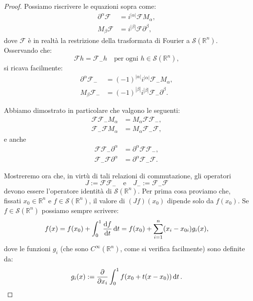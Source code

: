 \begin{proof}
Possiamo riscrivere le equazioni sopra come:
\begin{align*}
\partial^{{\alpha}} \mathcal{F} &= i^{|{\alpha}|} \mathcal{F} M_{{\alpha}},  \\
M_{{\beta}} \mathcal{F} &= i^{|{\beta}|} \mathcal{F} \partial^{{\beta}}, 
\end{align*}
dove $\mathcal{F}$ è in realtà la restrizione della trasformata di Fourier a $\mathcal{S}(\mathbb{R}^n)$. Osservando che:
\begin{equation*}
\mathcal{F} h = \mathcal{F}_{-} h \quad \text{per ogni } h \in \mathcal{S}(\mathbb{R}^n),
\end{equation*}
si ricava facilmente:
\begin{align*}
\partial^{{\alpha}} \mathcal{F}_{-} &= (-1)^{|{\alpha}|} i^{|{\alpha}|} \mathcal{F}_{-} M_{{\alpha}},  \\
M_{{\beta}} \mathcal{F}_{-} &= (-1)^{|{\beta}|} i^{|{\beta}|} \mathcal{F}_{-} \partial^{{\beta}}. 
\end{align*}

Abbiamo dimostrato in particolare che valgono le seguenti:
\begin{align*}
\mathcal{F}\mathcal{F}_{-} M_{{\alpha}} &= M_{{\alpha}} \mathcal{F}\mathcal{F}_{-},  \\
\mathcal{F}_{-}\mathcal{F} M_{{\alpha}} &= M_{{\alpha}} \mathcal{F}_{-}\mathcal{F}, 
\end{align*}
 e anche
\begin{align*}
\mathcal{F}\mathcal{F}_{-} \partial^{{\alpha}} &= \partial^{{\alpha}} \mathcal{F}\mathcal{F}_{-},  \\
\mathcal{F}_{-}\mathcal{F} \partial^{{\alpha}} &= \partial^{{\alpha}} \mathcal{F}_{-}\mathcal{F}. 
\end{align*}

Mostreremo ora che, in virtù di tali relazioni di commutazione, gli operatori
\begin{equation*}
J := \mathcal{F}\mathcal{F}_{-} \quad \text{e} \quad J_{-} := \mathcal{F}_{-}\mathcal{F}
\end{equation*}
devono essere l'operatore identità di $\mathcal{S}(\mathbb{R}^n)$. Per prima cosa proviamo che, fissati ${x}_0 \in \mathbb{R}^n$ e $f \in \mathcal{S}(\mathbb{R}^n)$, il valore di $(Jf)({x}_0)$ dipende solo da $f({x}_0)$. Se $f \in \mathcal{S}(\mathbb{R}^n)$ possiamo sempre scrivere:
\begin{equation*}
f({x}) = f({x}_0) + \int_0^1 \dv{f}{t}({x}_0 + t({x} - {x}_0)) \dd{t} = f({x}_0) + \sum_{i=1}^n (x_i - x_{0i}) g_i({x}),
\end{equation*}
dove le funzioni $g_i$ (che sono $C^\infty(\mathbb{R}^n)$, come si verifica facilmente) sono definite da:
\begin{equation*}
g_i({x}) := \pdv{}{x_i} \int_0^1 f({x}_0 + t({x} - {x}_0)) \dd{t}.
\end{equation*}


\end{proof}
